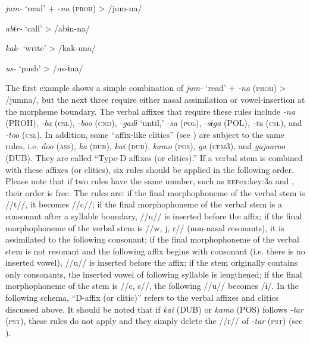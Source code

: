 \ea\label{ex:8-16}
\ea \textit{jum-}  ‘read’  +  \textit{-na} (\textsc{proh})  >  /jum-na/


\ex \textit{abɨr-}  ‘call’        >  /abɨn-na/


\ex \textit{kak-}  ‘write’        >  /kak-una/


\ex \textit{us-}  ‘push’        >  /us-ɨna/
\z
\z

The first example shows a simple combination of \textit{jum-} ‘read’ + \textit{-na} (\textsc{proh}) > /jumna/, but the next three require either nasal assimilation or vowel-insertion at the morpheme boundary. The verbal affixes that require these rules include \textit{-na} (PROH), \textit{-ba} (\textsc{csl}), \textit{-boo} (\textsc{cnd}), \textit{-gadɨ} ‘until,’ \textit{-sa} (\textsc{pol}), \textit{-sɨga} (POL), \textit{-tu} (\textsc{csl}), and \textit{-too} (\textsc{csl}). In addition, some “affix-like clitics” (see ) are subject to the same rules, i.e. \textit{doo} (\textsc{ass}), \textit{ka} (\textsc{dub}), \textit{kai} (\textsc{dub}), \textit{kamo} (\textsc{pos}), \textit{ga} (\textsc{cfm3}), and \textit{gajaaroo} (DUB). They are called “Type-D affixes (or clitics).” If a verbal stem is combined with these affixes (or clitics), six rules should be applied in the following order. Please note that if two rules have the same number, such as \textsc{ref}{ex:key:3a} and , their order is free. The rules are:  if the final morphophoneme of the verbal stem is //t//, it becomes //c//;  if the final morphophoneme of the verbal stem is a consonant after a syllable boundary, //u// is inserted before the affix;  if the final morphophoneme of the verbal stem is //w, j, r// (non-nasal resonants), it is assimilated to the following consonant;  if the final morphophoneme of the verbal stem is not resonant and the following affix begins with consonant (i.e. there is no inserted vowel), //u// is inserted before the affix;  if the stem originally contains only consonants, the inserted vowel of following syllable is lengthened;  if the final morphophoneme of the stem is //c, s//, the following //u// becomes /ɨ/. In the following schema, “D-affix (or clitic)” refers to the verbal affixes and clitics discussed above. It should be noted that if \textit{kai} (DUB) or \textit{kamo} (POS) follows \textit{-tar} (\textsc{pst}), these rules do not apply and they simply delete the //r// of \textit{-tar} (\textsc{pst}) (see ).

